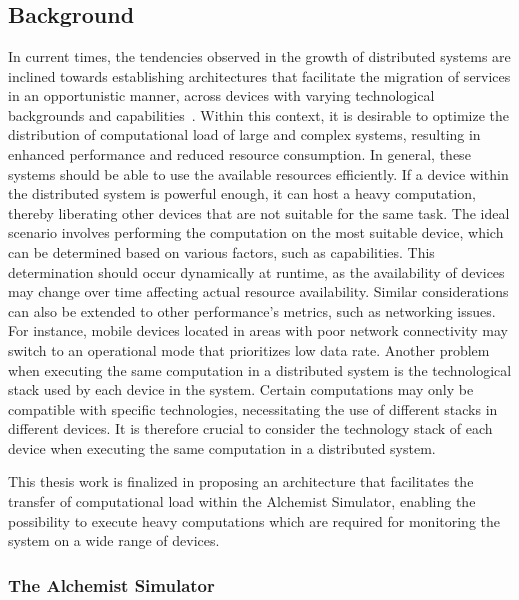 \chapter{\introductionname}
\label{chap:introduction}
\section{Background}
\label{sec:background}

In current times, the tendencies observed in the growth of distributed systems are inclined towards establishing architectures that facilitate the migration of services in an opportunistic manner, across devices with varying technological backgrounds and capabilities~\cite{MISHRA2020149}. Within this context, it is desirable to optimize the distribution of computational load of large and complex systems, resulting in enhanced performance and reduced resource consumption. In general, these systems should be able to use the available resources efficiently. If a device within the distributed system is powerful enough, it can host a heavy computation, thereby liberating other devices that are not suitable for the same task. The ideal scenario involves performing the computation on the most suitable device, which can be determined based on various factors, such as capabilities. This determination should occur dynamically at runtime, as the availability of devices may change over time affecting actual resource availability. Similar considerations can also be extended to other performance's metrics, such as networking issues. For instance, mobile devices located in areas with poor network connectivity may switch to an operational mode that prioritizes low data rate. Another problem when executing the same computation in a distributed system is the technological stack used by each device in the system. Certain computations may only be compatible with specific technologies, necessitating the use of different stacks in different devices. It is therefore crucial to consider the technology stack of each device when executing the same computation in a distributed system.\newline

This thesis work is finalized in proposing an architecture that facilitates the transfer of computational load within the Alchemist Simulator, enabling the possibility to execute heavy computations which are required for monitoring the system on a wide range of devices.

\subsection{The Alchemist Simulator}
\label{ssec:the-alchemist-simulator}
